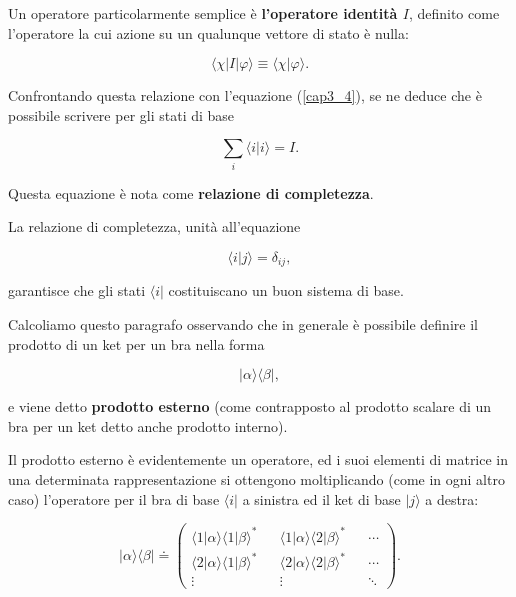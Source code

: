 \documentclass[a4paper,12pt,oneside]{book}
\begin{document}
Un operatore particolarmente semplice è \textbf{l'operatore identità $I$}, definito come l'operatore la cui azione su un qualunque vettore di stato è nulla:

\begin{equation}
\langle \chi | I | \varphi \rangle \equiv \langle \chi | \varphi \rangle .
\end{equation}

Confrontando questa relazione con l'equazione (\ref{cap3_4}), se ne deduce che è possibile scrivere per gli stati di base

\begin{equation}
\sum \limits_{i} \langle i | i \rangle = I .
\end{equation}

Questa equazione è nota come \textbf{relazione di completezza}.

La relazione di completezza, unità all'equazione

\begin{equation}
\langle i | j \rangle =\delta_{ij} ,
\end{equation}

garantisce che gli stati $\langle i | $ costituiscano un buon sistema di base.

Calcoliamo questo paragrafo osservando che in generale è possibile definire il prodotto di un ket per un bra nella forma

\begin{equation}
| \alpha \rangle \langle \beta |  ,
\end{equation}

e viene detto \textbf{prodotto esterno} (come contrapposto al prodotto scalare di un bra per un ket detto anche prodotto interno).

Il prodotto esterno è evidentemente un operatore, ed i suoi elementi di matrice in una determinata rappresentazione si ottengono moltiplicando (come in ogni altro caso) l'operatore per il bra di base $\langle i |$ a sinistra ed il ket di base $| j \rangle$ a destra:

\begin{equation}
| \alpha \rangle \langle \beta | \doteq
\begin{pmatrix}
\langle 1 | \alpha \rangle \langle 1 | \beta \rangle ^* && \langle 1 | \alpha \rangle \langle 2 | \beta \rangle ^* && \cdots \\
\langle 2 | \alpha \rangle \langle 1 | \beta \rangle ^* && \langle 2 | \alpha \rangle \langle 2 | \beta \rangle ^* &&  \cdots \\
\vdots && \vdots && \ddots
\end{pmatrix} .
\end{equation}
\end{document}
